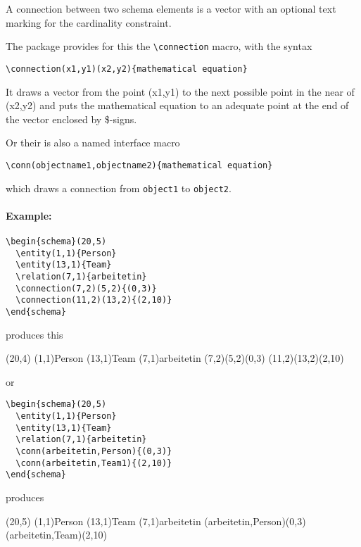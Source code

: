 \documentclass[a4paper,11pt]{article}
\begin{document}
A connection between two schema elements is a vector with an optional
text marking for the cardinality constraint.

The package provides for this the \verb|\connection| macro, with the syntax

\begin{verbatim}
\connection(x1,y1)(x2,y2){mathematical equation}
\end{verbatim}

It draws a vector from the point (x1,y1) to the next possible point in the near
of (x2,y2) and puts the mathematical equation to an adequate point at the end of the 
vector enclosed by \$-signs. 

Or their is also a named interface macro 

\begin{verbatim}
\conn(objectname1,objectname2){mathematical equation}
\end{verbatim}

which draws a connection from {\tt object1} to {\tt object2}.

\paragraph{Example:}

\begin{verbatim}
\begin{schema}(20,5)
  \entity(1,1){Person}
  \entity(13,1){Team}
  \relation(7,1){arbeitetin}
  \connection(7,2)(5,2){(0,3)}
  \connection(11,2)(13,2){(2,10)}
\end{schema}
\end{verbatim}

produces this

\begin{schema}(20,4)
  \entity(1,1){Person}
  \entity(13,1){Team}
  \relation(7,1){arbeitetin}
  \connection(7,2)(5,2){(0,3)}
  \connection(11,2)(13,2){(2,10)}
\end{schema}

or

\begin{verbatim}
\begin{schema}(20,5)
  \entity(1,1){Person}
  \entity(13,1){Team}
  \relation(7,1){arbeitetin}
  \conn(arbeitetin,Person){(0,3)}
  \conn(arbeitetin,Team1){(2,10)}
\end{schema}
\end{verbatim}

produces

\begin{schema}(20,5)
  \entity(1,1){Person}
  \entity(13,1){Team}
  \relation(7,1){arbeitetin}
  \conn(arbeitetin,Person){(0,3)}
  \conn(arbeitetin,Team){(2,10)}
\end{schema}
\end{document}
